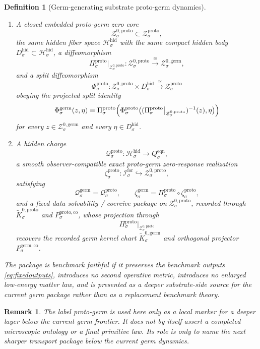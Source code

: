 \documentclass[11pt]{article}
\newcommand{\ForSpace}[1]{\mathcal I_{#1}^{\mathrm{for}}}
\newcommand{\EqnTarget}[1]{Q_{#1}^{\mathrm{eqn}}}
\newcommand{\HiddenSpace}[1]{\mathcal H_{#1}^{\mathrm{hid}}}
\newcommand{\HiddenBody}[1]{D_{#1}^{\mathrm{hid}}}
\newcommand{\GermShellSet}[1]{\mathcal Z_{#1}^{\mathrm{germ}}}
\newcommand{\GermZeroCore}[1]{\mathcal Z_{#1}^{0,\mathrm{germ}}}
\newcommand{\GermSplit}[1]{\Phi_{#1}^{\mathrm{germ}}}
\newcommand{\GermCharge}[1]{\mathcal Q_{#1}^{\mathrm{germ}}}
\newcommand{\GermEmbed}[1]{\zeta_{#1}^{\mathrm{germ}}}
\newcommand{\GermKernelCh}[1]{\widetilde K_{#1}^{0,\mathrm{germ}}}
\newcommand{\GermStateComp}[1]{P_{#1}^{\mathrm{germ,co}}}
\newcommand{\ProtoProj}[1]{\Pi_{#1}^{\mathrm{proto}}}
\newcommand{\ProtoShellSet}[1]{\mathcal Z_{#1}^{\mathrm{proto}}}
\newcommand{\ProtoZeroCore}[1]{\mathcal Z_{#1}^{0,\mathrm{proto}}}
\newcommand{\ProtoSplit}[1]{\Phi_{#1}^{\mathrm{proto}}}
\newcommand{\ProtoCharge}[1]{\mathcal Q_{#1}^{\mathrm{proto}}}
\newcommand{\ProtoEmbed}[1]{\zeta_{#1}^{\mathrm{proto}}}
\newcommand{\ProtoKernelCh}[1]{\widetilde K_{#1}^{0,\mathrm{proto}}}
\newcommand{\ProtoStateComp}[1]{P_{#1}^{\mathrm{proto,co}}}
\newtheorem{definition}{Definition}
\newtheorem{remark}{Remark}
\begin{document}
\begin{definition}[Germ-generating substrate proto-germ dynamics]
\begin{enumerate}
\[    \xrightarrow{\cong}
    \GermShellSet{\sigma}.
    \]
    \item A closed embedded proto-germ zero core
    \[
    \ProtoZeroCore{\sigma}\subset\ProtoShellSet{\sigma},
    \]
    the same hidden fiber space \(\HiddenSpace{\sigma}\) with the same compact hidden body \(\HiddenBody{\sigma}\subset\HiddenSpace{\sigma}\), a diffeomorphism
    \[
    \ProtoProj{\sigma}\big|_{\ProtoZeroCore{\sigma}}
    :
    \ProtoZeroCore{\sigma}
    \xrightarrow{\cong}
    \GermZeroCore{\sigma},
    \]
    and a split diffeomorphism
    \[
    \ProtoSplit{\sigma}:
    \ProtoZeroCore{\sigma}\times\HiddenBody{\sigma}
    \xrightarrow{\cong}
    \ProtoShellSet{\sigma}
    \]
    obeying the projected split identity
    \[
    \GermSplit{\sigma}(z,\eta)
    =
    \ProtoProj{\sigma}\Bigl(
    \ProtoSplit{\sigma}\bigl(
    (\ProtoProj{\sigma}\big|_{\ProtoZeroCore{\sigma}})^{-1}(z),\eta
    \bigr)\Bigr)
    \]
    for every \(z\in\GermZeroCore{\sigma}\) and every \(\eta\in\HiddenBody{\sigma}\).
    \item A hidden charge
    \[
    \ProtoCharge{\sigma}:\HiddenSpace{\sigma}\to\EqnTarget{\sigma},
    \]
    a smooth observer-compatible exact proto-germ zero-response realization
    \[
    \ProtoEmbed{\sigma}:\ForSpace{\sigma}\hookrightarrow\ProtoZeroCore{\sigma},
    \]
    satisfying
    \[
    \GermCharge{\sigma}
    =
    \ProtoCharge{\sigma},
    \qquad
    \GermEmbed{\sigma}
    =
    \ProtoProj{\sigma}\circ\ProtoEmbed{\sigma},
    \]
    and a fixed-data solvability / coercive package on \(\ProtoZeroCore{\sigma}\), recorded through \(\ProtoKernelCh{\sigma}\) and \(\ProtoStateComp{\sigma}\), whose projection through
    \[
    \ProtoProj{\sigma}\big|_{\ProtoZeroCore{\sigma}}
    \]
    recovers the recorded germ kernel chart \(\GermKernelCh{\sigma}\) and orthogonal projector \(\GermStateComp{\sigma}\).
\end{enumerate}
The package is \emph{benchmark faithful} if it preserves the benchmark outputs \eqref{eq:fixedoutputs}, introduces no second operative metric, introduces no enlarged low-energy matter law, and is presented as a deeper substrate-side source for the current germ package rather than as a replacement benchmark theory.
\end{definition}

\begin{remark}
The label \emph{proto-germ} is used here only as a local marker for a deeper layer below the current germ frontier. It does not by itself assert a completed microscopic ontology or a final primitive law. Its role is only to name the next sharper transport package below the current germ dynamics.
\end{remark}
\end{document}
